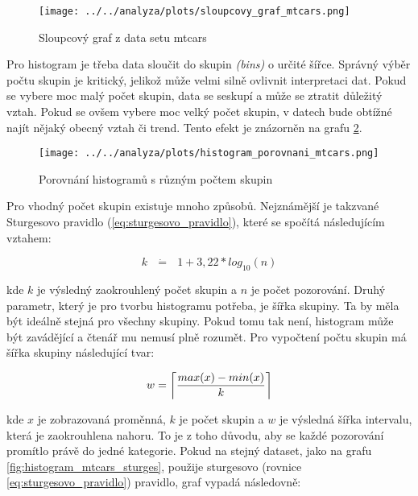 \begin{figure}[H]
    \centering
    \texttt{[image: ../../analyza/plots/sloupcovy\_graf\_mtcars.png]}
    \caption{Sloupcový graf z data setu mtcars} 
    \label{fig:sloupcovy_graf_mtcars}
\end{figure}

Pro histogram je třeba data sloučit do skupin \textit{(bins)} o určité šířce. Správný výběr počtu skupin je kritický, jelikož může velmi
silně ovlivnit interpretaci dat. Pokud se vybere moc malý počet skupin, data se seskupí a může se ztratit důležitý vztah. Pokud se ovšem
vybere moc velký počet skupin, v datech bude obtížné najít nějaký obecný vztah či trend.
Tento efekt je znázorněn na grafu \ref{fig:histogram_porovnani_mtcars}.

\begin{figure}[H]
    \centering
    \texttt{[image: ../../analyza/plots/histogram\_porovnani\_mtcars.png]}
    \caption{Porovnání histogramů s různým počtem skupin} 
    \label{fig:histogram_porovnani_mtcars}
\end{figure}

Pro vhodný počet skupin existuje mnoho způsobů. Nejznámější je takzvané Sturgesovo pravidlo (\ref{eq:sturgesovo_pravidlo}), které se spočítá následujícím vztahem:

\begin{equation}
    \label{eq:sturgesovo_pravidlo}
    k \text{ } \dot{\mathbf{=}} \text{ } 1 + 3,22 * log_{10}(n)
\end{equation}

kde $k$ je výsledný zaokrouhlený počet skupin a $n$ je počet pozorování. Druhý parametr, který je pro tvorbu histogramu potřeba, je šířka skupiny.
Ta by měla být ideálně stejná pro všechny skupiny. Pokud tomu tak není, histogram může být zavádějící a čtenář mu nemusí plně rozumět.
Pro vypočtení počtu skupin má šířka skupiny následující tvar:

\begin{equation}
    \label{eq:sirka_histogramu}
    w = \ceil[\bigg]{ \frac{max(x) - min(x)}{k} }
\end{equation}

kde $x$ je zobrazovaná proměnná, $k$ je počet skupin a $w$ je výsledná šířka intervalu, která je zaokrouhlena nahoru. To je z toho důvodu, aby se
každé pozorování promítlo právě do jedné kategorie. Pokud na stejný dataset, jako na grafu \ref{fig:histogram_mtcars_sturges}, použije sturgesovo
(rovnice \ref{eq:sturgesovo_pravidlo}) pravidlo, graf vypadá následovně:

